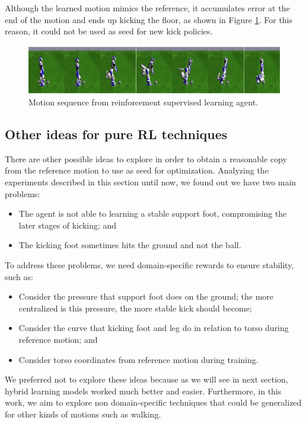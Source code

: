 Although the learned motion mimics the reference, it accumulates error at the end of the motion and ends up kicking the floor, as shown in Figure \ref{fig:rlsupmotionsequence}. For this reason, it could not be used as seed for new kick policies.

\begin{figure}[!htbp]
	\centering
	\includegraphics[width=1.0\textwidth]{Cap6/rlsupmotionsequence.eps}
	\caption{Motion sequence from reinforcement supervised learning agent.}
	\label{fig:rlsupmotionsequence}
\end{figure}

\subsection{Other ideas for pure RL techniques}

There are other possible ideas to explore in order to obtain a reasonable copy from the reference motion to use as seed for optimization. Analyzing the experiments described in this section until now, we found out we have two main problems:

\begin{itemize}
	\item The agent is not able to learning a stable support foot, compromising the later stages of kicking; and
	\item The kicking foot sometimes hits the ground and not the ball.
\end{itemize}

To address these problems, we need domain-specific rewards to ensure stability, such as:

\begin{itemize}
	\item Consider the pressure that support foot does on the ground; the more centralized is this pressure, the more stable kick should become;
	\item Consider the curve that kicking foot and leg do in relation to torso during reference motion; and
	\item Consider torso coordinates from reference motion during training.
\end{itemize}

We preferred not to explore these ideas because as we will see in next section, hybrid learning models worked much better and easier. Furthermore, in this work, we aim to explore non domain-specific techniques that could be generalized for other kinds of motions such as walking.

